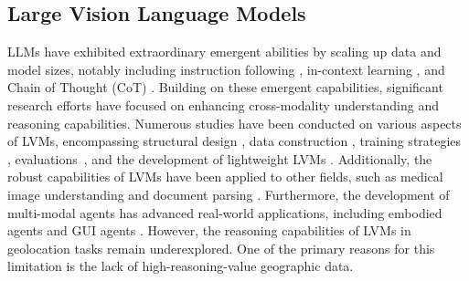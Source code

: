 \subsection{Large Vision Language Models}

LLMs have exhibited extraordinary emergent abilities by scaling up data and model sizes, notably including instruction following \cite{li2023llama, dai2024instructblip}, in-context learning \cite{brown2020language}, and Chain of Thought (CoT) \cite{kojima2022large}.
Building on these emergent capabilities, significant research efforts have focused on enhancing cross-modality understanding and reasoning capabilities. 
Numerous studies have been conducted on various aspects of LVMs, encompassing structural design \cite{liu2024visual, cai2023benchlmm, liu2024sphinx}, data construction \cite{laion2023gpt4v, zhao2024cobra}, training strategies \cite{zhao2023mamo,mckinzie2024mm1, lu2024deepseek}, evaluations~\cite{bithel2023evaluating}, and the development of lightweight LVMs \cite{ zhu2024comprehensive}.
Additionally, the robust capabilities of LVMs have been applied to other fields, such as medical image understanding \cite{tinyllava, pmc-vqa,zhang2024universal} and document parsing \cite{ye2023mplug, liu2024textmonkey}. 
Furthermore, the development of multi-modal agents has advanced real-world applications, including embodied agents \cite{huang2023embodied, peng2023kosmos} and GUI agents \cite{yang2023appagent, li2024appagent,song2024mmac}.
However, the reasoning capabilities of LVMs in geolocation tasks remain underexplored. 
One of the primary reasons for this limitation is the lack of high-reasoning-value geographic data. 




